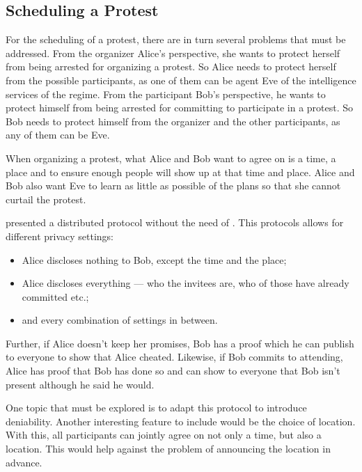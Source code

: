 

\subsection{Scheduling a Protest}
\label{Scheduling}

For the scheduling of a protest, there are in turn several problems that must 
be addressed.
From the organizer Alice's perspective, she wants to protect herself from being 
arrested for organizing a protest.
So Alice needs to protect herself from the possible participants, as one of 
them can be agent Eve of the intelligence services of the regime.
From the participant Bob's perspective, he wants to protect himself from being 
arrested for committing to participate in a protest.
So Bob needs to protect himself from the organizer and the other participants, 
as any of them can be Eve.

When organizing a protest, what Alice and Bob want to agree on is a time, 
a place and to ensure enough people will show up at that time and place.
Alice and Bob also want Eve to learn as little as possible of the plans so 
that she cannot curtail the protest.

\citet{EventsInvitations} presented a distributed protocol without the need of 
.
This protocols allows for different privacy settings:
\begin{itemize}
\item Alice discloses nothing to Bob, except the time and the place;
\item Alice discloses everything --- who the invitees are, who of those have 
  already committed etc.;
\item and every combination of settings in between.
\end{itemize}
Further, if Alice doesn't keep her promises, Bob has a proof which he can 
publish to everyone to show that Alice cheated.
Likewise, if Bob commits to attending, Alice has proof that Bob has done so and 
can show to everyone that Bob isn't present although he said he would.

One topic that must be explored is to adapt this protocol to introduce 
deniability.
Another interesting feature to include would be the choice of location.
With this, all participants can jointly agree on not only a time, but also 
a location.
This would help against the problem of announcing the location in advance.




